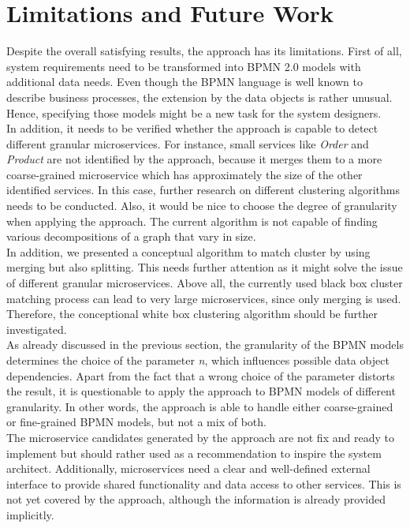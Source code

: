 \section{Limitations and Future Work}
Despite the overall satisfying results, the approach has its limitations. First of all, system requirements need to be transformed into BPMN 2.0 models with additional data needs. Even though the BPMN language is well known to describe business processes, the extension by the data objects is rather unusual. Hence, specifying those models might be a new task for the system designers.  \\
In addition, it needs to be verified whether the approach is capable to detect different granular microservices. For instance, small services like \textit{Order} and \textit{Product} are not identified by the approach, because it merges them to a more coarse-grained microservice which has approximately the size of the other identified services. In this case, further research on different clustering algorithms needs to be conducted. Also, it would be nice to choose the degree of granularity when applying the approach. The current algorithm is not capable of finding various decompositions of a graph that vary in size. \\
In addition, we presented a conceptual algorithm to match cluster by using merging but also splitting. This needs further attention as it might solve the issue of different granular microservices.  Above all, the currently used black box cluster matching process can lead to very large microservices, since only merging is used. Therefore, the conceptional white box clustering algorithm should be further investigated. \\
As already discussed in the previous section, the granularity of the BPMN models determines the choice of the parameter \textit{n}, which influences possible data object dependencies. 
Apart from the fact that a wrong choice of the parameter distorts the result, it is questionable to apply the approach to BPMN models of different granularity. In other words, the approach is able to handle either coarse-grained or fine-grained BPMN models, but not a mix of both. \\
The microservice candidates generated by the approach are not fix and ready to implement but should rather used as a recommendation to inspire the system architect. Additionally, microservices need a clear and well-defined external interface to provide shared functionality and data access to other services. This is not yet covered by the approach, although the information is already provided implicitly. 




